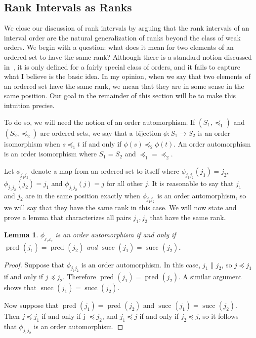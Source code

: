 \documentclass[12pt]{article}
\newcommand{\incomp}[1][]{\|_{#1}}
\newcommand{\pset}[2][]{\operatorname{pred}_{#1}(#2)}
\newcommand{\sset}[2][]{\operatorname{succ}_{#1}(#2)}
\numberwithin{theorem}{section}
\newtheorem{lemma}[theorem]{Lemma}
\begin{document}
\subsection{Rank Intervals as Ranks}

We close our discussion of rank intervals by arguing that the rank intervals of an interval order are the natural generalization of ranks beyond the class of weak orders.  We begin with a question: what does it mean for two elements of an ordered set to have the same rank?  Although there is a standard notion discussed in~\cite{stanley2011book}, it is only defined for a fairly special class of orders, and it fails to capture what I believe is the basic idea.  In my opinion, when we say that two elements of an ordered set have the same rank, we mean that they are in some sense in the same position.  Our goal in the remainder of this section will be to make this intuition precise.

To do so, we will need the notion of an order automorphism.  If $(S_1, \preceq_1)$ and $(S_2, \preceq_2)$ are ordered sets, we say that a bijection $\phi : S_1 \rightarrow S_2$ is an order isomorphism when $s \preceq_1 t$ if and only if $\phi(s) \preceq_2 \phi(t)$.  An order automorphism is an order isomorphism where $S_1 = S_2$ and $\preceq_1 = \preceq_2$.

Let $\phi_{j_1j_2}$ denote a map from an ordered set to itself where $\phi_{j_1j_2}(j_1) = j_2$, $\phi_{j_1j_2}(j_2) = j_1$ and $\phi_{j_1j_2}(j) = j$ for all other $j$.  It is reasonable to say that $j_1$ and $j_2$ are in the same position exactly when $\phi_{j_1j_2}$ is an order automorphism, so we will say that they have the same rank in this case.  We will now state and prove a lemma that characterizes all pairs $j_1, j_2$ that have the same rank.

\begin{lemma}
\label{lem_aut}
$\phi_{j_1j_2}$ is an order automorphism if and only if $\pset{j_1} = \pset{j_2}$ and $\sset{j_1} = \sset{j_2}$.
\end{lemma}
\begin{proof}
Suppose that $\phi_{j_1j_2}$ is an order automorphism.  In this case, $j_1 \incomp j_2$, so $j \preceq j_1$ if and only if $j \preceq j_2$.  Therefore $\pset{j_1} = \pset{j_2}$.  A similar argument shows that $\sset{j_1} = \sset{j_2}$.

Now suppose that $\pset{j_1} = \pset{j_2}$ and $\sset{j_1} = \sset{j_2}$.  Then $j \preceq j_1$ if and only if j $\preceq j_2$, and $j_1 \preceq j$ if and only if $j_2 \preceq j$, so it follows that $\phi_{j_1j_2}$ is an order automorphism.
\end{proof}
\end{document}
